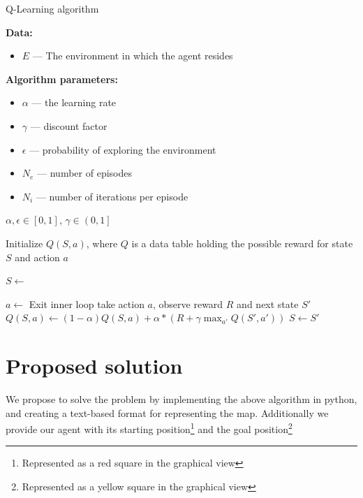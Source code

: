 \documentclass[12pt]{article}
\begin{document}
\begin{algorithm}[H]
  \caption{Q-Learning algorithm}
  \textbf{Data:}
  \begin{itemize}
    \item $E$ --- The environment in which the agent resides
  \end{itemize}
  \textbf{Algorithm parameters:}
  \begin{itemize}
    \item $\alpha$ --- the learning rate
    \item $\gamma$ --- discount factor
    \item $\epsilon$ --- probability of exploring the environment
    \item $N_e$ --- number of episodes
    \item $N_i$ --- number of iterations per episode
  \end{itemize}
  \begin{algorithmic}
    \Require $\alpha, \epsilon \in \left[0, 1 \right]$, $\gamma \in \left(0, 1\right]$

    \State Initialize $Q(S, a)$, where $Q$ is a data table holding the possible reward for state $S$ and action $a$

    \State $S \gets$ 

    \State $a \gets$ 
    \State Exit inner loop
    \EndIf
    \State take action $a$, observe reward $R$ and next state $S'$
    \State $Q(S, a) \gets (1 - \alpha)Q(S, a) + \alpha * (R + \gamma \max_{a'}{Q(S', a')})$
    \State $S \gets S'$
    \EndFor

    \EndFor

    \EndProcedure
  \end{algorithmic}
\end{algorithm}

\section{Proposed solution}
We propose to solve the problem by implementing the above algorithm in python, and creating
a text-based format for representing the map. Additionally we provide our agent with its
starting position\footnote{Represented as a red square in the graphical view} and the goal position\footnote{Represented
as a yellow square in the graphical view}
\end{document}
